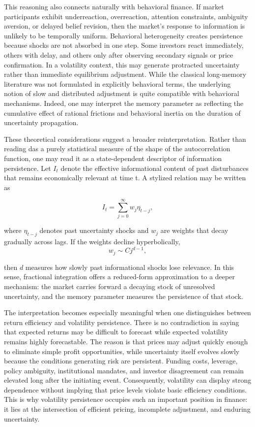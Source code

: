 \documentclass[12pt]{article}
\begin{document}
This reasoning also connects naturally with behavioral finance. If market participants exhibit underreaction, overreaction, attention constraints, ambiguity aversion, or delayed belief revision, then the market's response to information is unlikely to be temporally uniform. Behavioral heterogeneity creates persistence because shocks are not absorbed in one step. Some investors react immediately, others with delay, and others only after observing secondary signals or price confirmation. In a volatility context, this may generate protracted uncertainty rather than immediate equilibrium adjustment. While the classical long-memory literature was not formulated in explicitly behavioral terms, the underlying notion of slow and distributed adjustment is quite compatible with behavioral mechanisms. Indeed, one may interpret the memory parameter as reflecting the cumulative effect of rational frictions and behavioral inertia on the duration of uncertainty propagation.

These theoretical considerations suggest a broader reinterpretation. Rather than reading das a purely statistical measure of the shape of the autocorrelation function, one may read it as a state-dependent descriptor of information persistence. Let $I_t$ denote the effective informational content of past disturbances that remains economically relevant at time t. A stylized relation may be written as

\[I_t = \sum_{j=0}^{\infty} w_j \eta_{t-j},\]

where $\eta_{t-j}$ denotes past uncertainty shocks and $w_j$ are weights that decay gradually across lags. If the weights decline hyperbolically,\n\n\[w_j \sim C j^{d-1},\]

then $d$ measures how slowly past informational shocks lose relevance. In this sense, fractional integration offers a reduced-form approximation to a deeper mechanism: the market carries forward a decaying stock of unresolved uncertainty, and the memory parameter measures the persistence of that stock.

The interpretation becomes especially meaningful when one distinguishes between return efficiency and volatility persistence. There is no contradiction in saying that expected returns may be difficult to forecast while expected volatility remains highly forecastable. The reason is that prices may adjust quickly enough to eliminate simple profit opportunities, while uncertainty itself evolves slowly because the conditions generating risk are persistent. Funding costs, leverage, policy ambiguity, institutional mandates, and investor disagreement can remain elevated long after the initiating event. Consequently, volatility can display strong dependence without implying that price levels violate basic efficiency conditions. This is why volatility persistence occupies such an important position in finance: it lies at the intersection of efficient pricing, incomplete adjustment, and enduring uncertainty.
\end{document}
